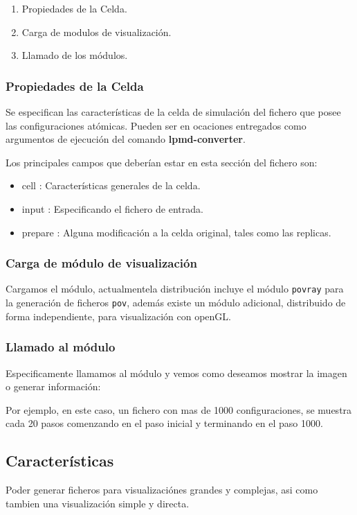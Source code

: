 \begin{enumerate}
 \item Propiedades de la Celda.
 \item Carga de modulos de visualizaci\'on.
 \item Llamado de los m\'odulos.
\end{enumerate}

\subsubsection{Propiedades de la Celda}
Se especifican las caracter\'isticas de la celda de simulaci\'on del fichero que posee las configuraciones at\'omicas. Pueden ser en ocaciones entregados como argumentos de ejecuci\'on del comando \textbf{lpmd-converter}.

Los principales campos que deber\'ian estar en esta secci\'on del fichero son:
\begin{itemize}
 \item cell : Caracter\'isticas generales de la celda.
 \item input : Especificando el fichero de entrada.
 \item prepare : Alguna modificaci\'on a la celda original, tales como las replicas.
\end{itemize}
\subsubsection{Carga de m\'odulo de visualizaci\'on}
Cargamos el m\'odulo, actualmentela distribuci\'on incluye el m\'odulo \verb|povray| para la generaci\'on de ficheros \verb|pov|, adem\'as existe un m\'odulo adicional, distribuido de forma independiente, para visualizaci\'on con openGL.

\subsubsection{Llamado al m\'odulo}
Especificamente llamamos al m\'odulo y vemos como deseamos mostrar la imagen o generar informaci\'on:


Por ejemplo, en este caso, un fichero con mas de 1000 configuraciones, se muestra cada 20 pasos comenzando en el paso inicial y terminando en el paso 1000.

\subsection{Caracter\'isticas}
Poder generar ficheros para visualizaci\'ones grandes y complejas, asi como tambien una visualizaci\'on simple y directa.

